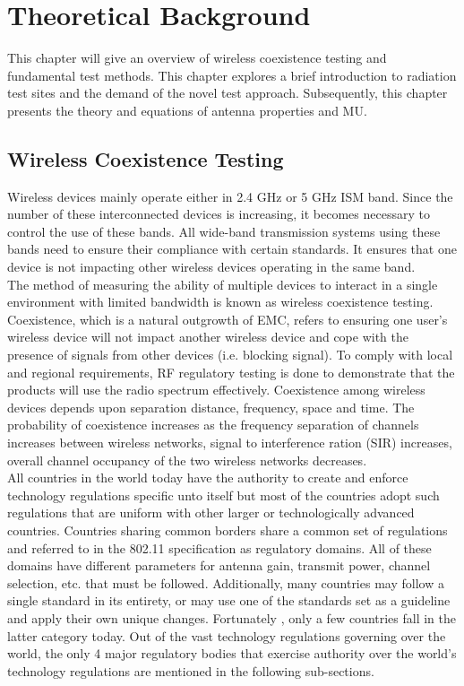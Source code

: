 \chapter{Theoretical Background}\label{chap:theorie}

This chapter will give an overview of wireless coexistence testing and fundamental test methods. This chapter explores a brief introduction to radiation test sites and the demand of the novel test approach. Subsequently,
this chapter presents the theory and equations of antenna properties and \acf{MU}.

\section{ Wireless Coexistence Testing  } 
Wireless devices mainly operate either in 2.4 GHz or 5 GHz \acf{ISM} band. Since the number of these interconnected devices is increasing, it becomes necessary to control the use of these bands. All wide-band transmission systems using these bands need to ensure their compliance with certain standards.  It ensures that one device is not impacting other wireless devices operating in the same band. \\

The method of measuring the ability of multiple devices to interact in a single environment with limited bandwidth is known as wireless coexistence testing. Coexistence, which is a natural outgrowth of \acf{EMC}, refers to ensuring one user's wireless device will not impact another wireless device and cope with the presence of signals from other devices (i.e. blocking signal). To comply with local and regional requirements, \acs{RF} regulatory testing is done to demonstrate that the products will use the radio spectrum effectively. Coexistence among wireless devices depends upon separation distance, frequency, space and time. The probability of coexistence increases as the frequency separation of channels increases between wireless networks, signal to interference ration (SIR) increases, overall channel occupancy of the two wireless networks decreases. \\

All countries in the world today have the authority to create and enforce technology regulations specific unto itself but most of the countries adopt such regulations that are uniform with other larger or technologically advanced countries. Countries sharing common borders share a common set of regulations and referred to in the 802.11 specification as regulatory domains. All of these domains have different parameters for antenna gain, transmit power, channel selection, etc. that must be followed. Additionally, many countries may follow a single standard in its entirety, or may use one of the standards set as a guideline and apply their own unique changes. Fortunately , only a few countries fall in the latter category today. Out of the vast technology regulations governing over the world, the only 4 major regulatory bodies that exercise authority over the world's technology regulations are mentioned in the following sub-sections.

